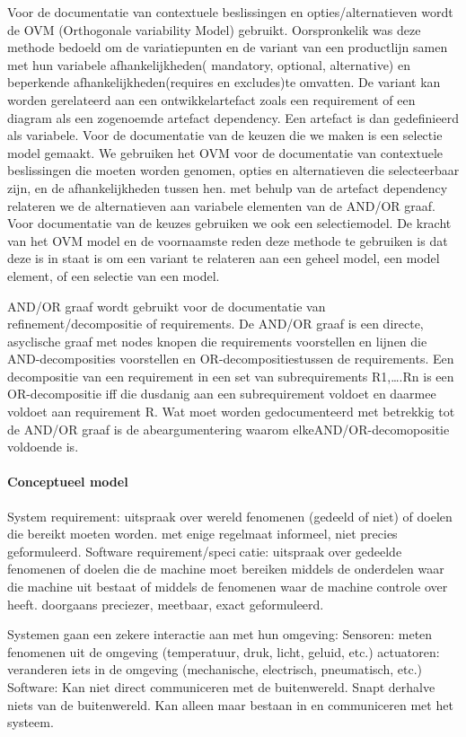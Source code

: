 Voor de documentatie van contextuele beslissingen en opties/alternatieven wordt de OVM (Orthogonale variability Model) gebruikt. Oorspronkelik was deze methode bedoeld om de variatiepunten en de variant van een productlijn samen met hun variabele afhankelijkheden( mandatory, optional, alternative)  en beperkende afhankelijkheden(requires en excludes)te omvatten. De variant kan worden gerelateerd aan een ontwikkelartefact zoals een requirement of een diagram als een zogenoemde artefact dependency. Een artefact is dan gedefinieerd als variabele. Voor de documentatie van de keuzen die we maken is een selectie model gemaakt. We gebruiken het OVM voor de documentatie van contextuele beslissingen die moeten worden genomen, opties en alternatieven die selecteerbaar zijn, en de afhankelijkheden tussen hen. met behulp van de artefact dependency relateren we de alternatieven aan variabele elementen van de AND/OR graaf. Voor documentatie van de keuzes gebruiken we ook een selectiemodel. De kracht van het OVM model en de voornaamste reden deze methode te gebruiken is dat deze is in staat is om een variant te relateren aan een geheel model, een model element, of een selectie van een model. 

AND/OR graaf wordt gebruikt voor de documentatie van refinement/decompositie of requirements. De AND/OR graaf is een directe, asyclische graaf met nodes knopen die requirements voorstellen en lijnen die AND-decomposities voorstellen en OR-decompositiestussen de requirements. Een decompositie van een requirement in een set van subrequirements R1,….Rn is een OR-decompositie iff die dusdanig aan een subrequirement voldoet en daarmee voldoet aan requirement R. Wat moet worden gedocumenteerd met betrekkig tot de AND/OR graaf is de abeargumentering waarom elkeAND/OR-decomopositie  voldoende is. 
\paragraph{Conceptueel model}



System requirement:
uitspraak over wereld fenomenen (gedeeld of niet) of doelen
die bereikt moeten worden.
met enige regelmaat informeel, niet precies geformuleerd.
Software requirement/specicatie:
uitspraak over gedeelde fenomenen of doelen die de machine
moet bereiken middels de onderdelen waar die machine uit
bestaat of middels de fenomenen waar de machine controle
over heeft.
doorgaans preciezer, meetbaar, exact geformuleerd.


Systemen gaan een zekere interactie aan met hun omgeving:
Sensoren: meten fenomenen uit de omgeving (temperatuur,
druk, licht, geluid, etc.)
actuatoren: veranderen iets in de omgeving (mechanische,
electrisch, pneumatisch, etc.)
Software:
Kan niet direct communiceren met de buitenwereld.
Snapt derhalve niets van de buitenwereld.
Kan alleen maar bestaan in en communiceren met het
systeem.


